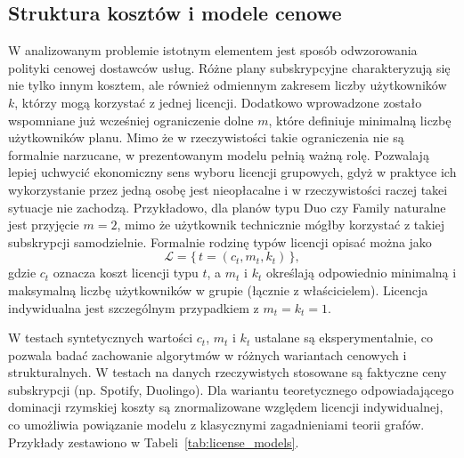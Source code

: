 \subsection{Struktura kosztów i modele cenowe}

W analizowanym problemie istotnym elementem jest sposób odwzorowania polityki cenowej dostawców usług. Różne plany subskrypcyjne charakteryzują się nie tylko innym kosztem, ale również odmiennym zakresem liczby użytkowników $k$, którzy mogą korzystać z jednej licencji. Dodatkowo wprowadzone zostało wspomniane już wcześniej ograniczenie dolne $m$, które definiuje minimalną liczbę użytkowników planu. Mimo że w rzeczywistości takie ograniczenia nie są formalnie narzucane, w prezentowanym modelu pełnią ważną rolę. Pozwalają lepiej uchwycić ekonomiczny sens wyboru licencji grupowych, gdyż w praktyce ich wykorzystanie przez jedną osobę jest nieopłacalne i w rzeczywistości raczej takei sytuacje nie zachodzą. Przykładowo, dla planów typu Duo czy Family naturalne jest przyjęcie $m=2$, mimo że użytkownik technicznie mógłby korzystać z takiej subskrypcji samodzielnie. Formalnie rodzinę typów licencji opisać można jako
\[
\mathcal{L} = \{\, t = (c_t, m_t, k_t) \,\},
\]
gdzie $c_t$ oznacza koszt licencji typu $t$, a $m_t$ i $k_t$ określają odpowiednio minimalną i maksymalną liczbę użytkowników w grupie (łącznie z właścicielem). Licencja indywidualna jest szczególnym przypadkiem z $m_t = k_t = 1$.

W testach syntetycznych wartości $c_t$, $m_t$ i $k_t$ ustalane są eksperymentalnie, co pozwala badać zachowanie algorytmów w różnych wariantach cenowych i strukturalnych. W testach na danych rzeczywistych stosowane są faktyczne ceny subskrypcji (np. Spotify, Duolingo). Dla wariantu teoretycznego odpowiadającego dominacji rzymskiej koszty są znormalizowane względem licencji indywidualnej, co umożliwia powiązanie modelu z klasycznymi zagadnieniami teorii grafów. Przykłady zestawiono w Tabeli~\ref{tab:license_models}.

